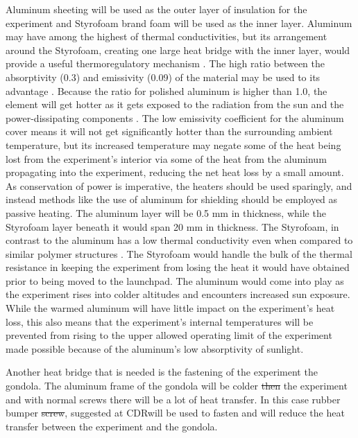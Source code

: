 \documentclass[a4paper,12pt,oneside]{article} %
\providecommand{\DIFaddtex}[1]{{\protect\color{blue}\uwave{#1}}} %
\providecommand{\DIFdeltex}[1]{{\protect\color{red}\sout{#1}}}                      %
\providecommand{\DIFaddbegin}{} %
\providecommand{\DIFaddend}{} %
\providecommand{\DIFdelbegin}{} %
\providecommand{\DIFdelend}{} %
\providecommand{\DIFadd}[1]{\texorpdfstring{\DIFaddtex{#1}}{#1}} %
\providecommand{\DIFdel}[1]{\texorpdfstring{\DIFdeltex{#1}}{}} %
\newcommand{\DIFscaledelfig}{0.5}
\newlength{\DIFdelgraphicswidth} %
\newlength{\DIFdelgraphicsheight} %
\newcommand{\DIFaddincludegraphics}[2][]{{\color{blue}\fbox{\DIFOincludegraphics[#1]{#2}}}} %
\newcommand{\DIFdelincludegraphics}[2][]{%
\sbox{\DIFdelgraphicsbox}{\DIFOincludegraphics[#1]{#2}}%
\settoboxwidth{\DIFdelgraphicswidth}{\DIFdelgraphicsbox} %
\settoboxtotalheight{\DIFdelgraphicsheight}{\DIFdelgraphicsbox} %
\scalebox{\DIFscaledelfig}{%
\parbox[b]{\DIFdelgraphicswidth}{\usebox{\DIFdelgraphicsbox}\\[-\baselineskip] \rule{\DIFdelgraphicswidth}{0em}}\llap{\resizebox{\DIFdelgraphicswidth}{\DIFdelgraphicsheight}{%
\setlength{\unitlength}{\DIFdelgraphicswidth}%
\begin{picture}(1,1)%
\thicklines\linethickness{2pt} %
{\color[rgb]{1,0,0}\put(0,0){\framebox(1,1){}}}%
{\color[rgb]{1,0,0}\put(0,0){\line( 1,1){1}}}%
{\color[rgb]{1,0,0}\put(0,1){\line(1,-1){1}}}%
\end{picture}%
}\hspace*{3pt}}} %
} %
\DeclareRobustCommand{\DIFaddbegin}{\DIFOaddbegin \let\includegraphics\DIFaddincludegraphics} %
\DeclareRobustCommand{\DIFaddend}{\DIFOaddend \let\includegraphics\DIFOincludegraphics} %
\DeclareRobustCommand{\DIFdelbegin}{\DIFOdelbegin \let\includegraphics\DIFdelincludegraphics} %
\DeclareRobustCommand{\DIFdelend}{\DIFOaddend \let\includegraphics\DIFOincludegraphics} %
\begin{document}
Aluminum sheeting will be used as the outer layer of insulation for the experiment and Styrofoam brand foam will be used as the inner layer. Aluminum may have among the highest of thermal conductivities, but its arrangement around the Styrofoam, creating one large heat bridge with the inner layer, would provide a useful thermoregulatory mechanism \cite{EngTool}. The high ratio between the absorptivity (0.3) and emissivity (0.09) of the material may be used to its advantage \cite{EngTool}. Because the ratio for polished aluminum is higher than 1.0, the element will get hotter as it gets exposed to the radiation from the sun and the power-dissipating components \cite{RedRok}. The low emissivity coefficient for the aluminum cover means it will not get significantly hotter than the surrounding ambient temperature, but its increased temperature may negate some of the heat being lost from the experiment's interior via some of the heat from the aluminum propagating into the experiment, reducing the net heat loss by a small amount. As conservation of power is imperative, the heaters should be used sparingly, and instead methods like the use of aluminum for shielding should be employed as passive heating. The aluminum layer will be 0.5 mm in thickness, while the Styrofoam layer beneath it would span 20 mm in thickness. The Styrofoam, in contrast to the aluminum has a low thermal conductivity even when compared to similar polymer structures \cite{EngTool}. The Styrofoam would handle the bulk of the thermal resistance in keeping the experiment from losing the heat it would have obtained prior to being moved to the launchpad. The aluminum would come into play as the experiment rises into colder altitudes and encounters increased sun exposure. While the warmed aluminum will have little impact on the experiment's heat loss, this also means that the experiment's internal temperatures will be prevented from rising to the upper allowed operating limit of the experiment made possible because of the aluminum's low absorptivity of sunlight.
\DIFaddbegin 

\DIFaddend Another heat bridge that is needed is the fastening of the experiment \DIFaddbegin \DIFadd{to }\DIFaddend the gondola. The aluminum frame of the gondola will be colder \DIFdelbegin \DIFdel{then }\DIFdelend \DIFaddbegin \DIFadd{than }\DIFaddend the experiment and with normal screws there will be a lot of heat transfer. In this case rubber bumper \DIFdelbegin \DIFdel{screw}\DIFdelend \DIFaddbegin \DIFadd{screws}\DIFaddend , suggested at CDR\DIFaddbegin \DIFadd{, }\DIFaddend will be used to fasten \DIFaddbegin \DIFadd{the experiment to the gondola }\DIFaddend and will reduce the heat transfer between the experiment and the gondola.
\end{document}
